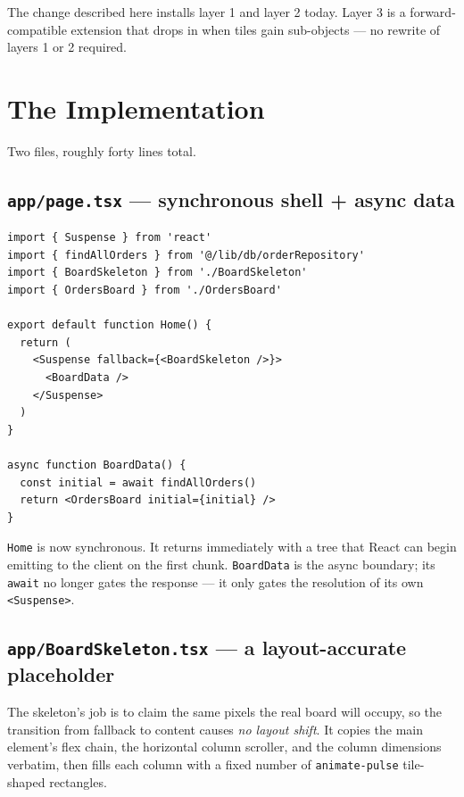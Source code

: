 \documentclass[11pt]{article}
\begin{document}
The change described here installs layer 1 and layer 2 today. Layer 3 is a forward-compatible extension that drops in when tiles gain sub-objects --- no rewrite of layers 1 or 2 required.

\section{The Implementation}

Two files, roughly forty lines total.

\subsection{\texttt{app/page.tsx} --- synchronous shell + async data}

\begin{lstlisting}
import { Suspense } from 'react'
import { findAllOrders } from '@/lib/db/orderRepository'
import { BoardSkeleton } from './BoardSkeleton'
import { OrdersBoard } from './OrdersBoard'

export default function Home() {
  return (
    <Suspense fallback={<BoardSkeleton />}>
      <BoardData />
    </Suspense>
  )
}

async function BoardData() {
  const initial = await findAllOrders()
  return <OrdersBoard initial={initial} />
}
\end{lstlisting}

\texttt{Home} is now synchronous. It returns immediately with a tree that React can begin emitting to the client on the first chunk. \texttt{BoardData} is the async boundary; its \texttt{await} no longer gates the response --- it only gates the resolution of its own \texttt{<Suspense>}.

\subsection{\texttt{app/BoardSkeleton.tsx} --- a layout-accurate placeholder}

The skeleton's job is to claim the same pixels the real board will occupy, so the transition from fallback to content causes \emph{no layout shift}. It copies the main element's flex chain, the horizontal column scroller, and the column dimensions verbatim, then fills each column with a fixed number of \texttt{animate-pulse} tile-shaped rectangles.
\end{document}
